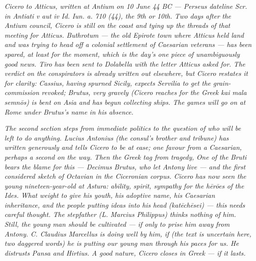 
\textit{Cicero to Atticus, written at Antium on 10 June 44 BC
--- Perseus dateline \textit{Scr. in Antiati v aut iv Id. Iun.
a. 710 (44)}, the 9th or 10th. Two days after the Antium
council, Cicero is still on the coast and tying up the threads
of that meeting for Atticus. Buthrotum --- the old Epirote town
where Atticus held land and was trying to head off a colonial
settlement of Caesarian veterans --- has been spared, at least
for the moment, which is the day's one piece of unambiguously
good news. Tiro has been sent to Dolabella with the letter
Atticus asked for. The verdict on the conspirators is already
written out elsewhere, but Cicero restates it for clarity:
Cassius, having spurned Sicily, expects Servilia to get the
grain-commission revoked; Brutus, very gravely (Cicero reaches
for the Greek \textit{kai mala semnōs}) is bent on Asia and has
begun collecting ships. The games will go on at Rome under
Brutus's name in his absence.}

\textit{The second section steps from immediate politics to the
question of who will be left to do anything. Lucius Antonius
(the consul's brother and tribune) has written generously and
tells Cicero to be at ease; one favour from a Caesarian, perhaps
a second on the way. Then the Greek tag from tragedy, \textit{One
of the Bruti bears the blame for this} --- Decimus Brutus, who
let Antony live --- and the first considered sketch of Octavian
in the Ciceronian corpus. Cicero has now seen the young
nineteen-year-old at Astura: ability, spirit, sympathy for the
\textit{hērōes} of the Ides. What weight to give his youth, his
adoptive name, his Caesarian inheritance, and the people putting
ideas into his head \textit{(katēchēsei)} --- this needs careful
thought. The stepfather (L. Marcius Philippus) thinks nothing of
him. Still, the young man should be cultivated --- if only to
prise him away from Antony. C. Claudius Marcellus is doing well
by him, if (the text is uncertain here, two daggered words)
\textit{he is putting our young man through his paces for us}.
He distrusts Pansa and Hirtius. A good nature, Cicero closes in
Greek --- \textit{if it lasts}.}
